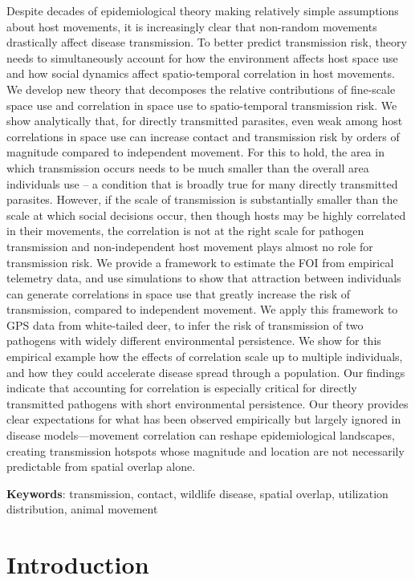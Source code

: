 \documentclass[letterpaper]{article}
\begin{document}
Despite decades of epidemiological theory making relatively simple assumptions about host movements, it is increasingly clear that non-random movements drastically affect disease transmission. To better predict transmission risk, theory needs to simultaneously account for how the environment affects host space use and how social dynamics affect spatio-temporal correlation in host movements. We develop new theory that decomposes the relative contributions of fine-scale space use and correlation in space use to spatio-temporal transmission risk. We show analytically that, for directly transmitted parasites, even weak among host correlations in space use can increase contact and transmission risk by orders of magnitude compared to independent movement. For this to hold, the area in which transmission occurs needs to be much smaller than the overall area individuals use -- a condition that is broadly true for many directly transmitted parasites. However, if the scale of transmission is substantially smaller than the scale at which social decisions occur, then though hosts may be highly correlated in their movements, the correlation is not at the right scale for pathogen transmission and non-independent host movement plays almost no role for transmission risk. We provide a framework to estimate the FOI from empirical telemetry data, and use simulations to show that attraction between individuals can generate correlations in space use that greatly increase the risk of transmission, compared to independent movement. We apply this framework to GPS data from white-tailed deer, to infer the risk of transmission of two pathogens with widely different environmental persistence. We show for this empirical example how the effects of correlation scale up to multiple individuals, and how they could accelerate disease spread through a population. Our findings indicate that accounting for correlation is especially critical for directly transmitted pathogens with short environmental persistence. Our theory provides clear expectations for what has been observed empirically but largely ignored in disease models---movement correlation can reshape epidemiological landscapes, creating transmission hotspots whose magnitude and location are not necessarily predictable from spatial overlap alone.

\bigskip
\noindent
\textbf{Keywords}: transmission, contact, wildlife disease, spatial overlap, utilization distribution, animal movement

\section*{Introduction}
\end{document}
